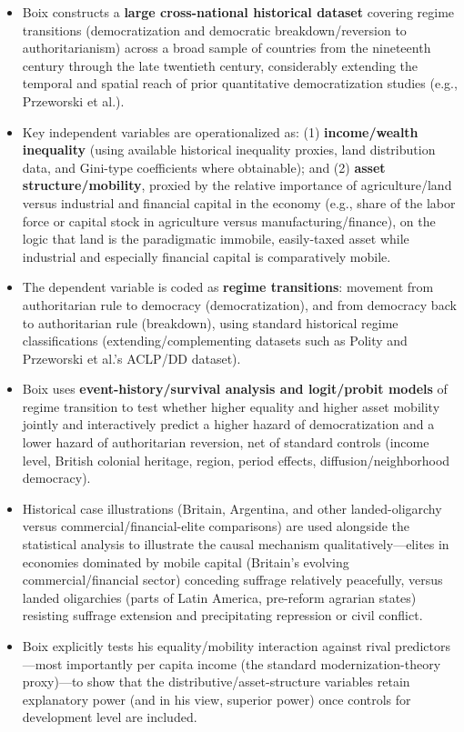 \documentclass[12pt]{article}
\begin{document}
\begin{itemize}[leftmargin=*, itemsep=4pt]
    \item Boix constructs a \textbf{large cross-national historical dataset} covering regime transitions (democratization and democratic breakdown/reversion to authoritarianism) across a broad sample of countries from the nineteenth century through the late twentieth century, considerably extending the temporal and spatial reach of prior quantitative democratization studies (e.g., Przeworski et al.).
    \item Key independent variables are operationalized as: (1) \textbf{income/wealth inequality} (using available historical inequality proxies, land distribution data, and Gini-type coefficients where obtainable); and (2) \textbf{asset structure/mobility}, proxied by the relative importance of agriculture/land versus industrial and financial capital in the economy (e.g., share of the labor force or capital stock in agriculture versus manufacturing/finance), on the logic that land is the paradigmatic immobile, easily-taxed asset while industrial and especially financial capital is comparatively mobile.
    \item The dependent variable is coded as \textbf{regime transitions}: movement from authoritarian rule to democracy (democratization), and from democracy back to authoritarian rule (breakdown), using standard historical regime classifications (extending/complementing datasets such as Polity and Przeworski et al.'s ACLP/DD dataset).
    \item Boix uses \textbf{event-history/survival analysis and logit/probit models} of regime transition to test whether higher equality and higher asset mobility jointly and interactively predict a higher hazard of democratization and a lower hazard of authoritarian reversion, net of standard controls (income level, British colonial heritage, region, period effects, diffusion/neighborhood democracy).
    \item Historical case illustrations (Britain, Argentina, and other landed-oligarchy versus commercial/financial-elite comparisons) are used alongside the statistical analysis to illustrate the causal mechanism qualitatively---elites in economies dominated by mobile capital (Britain's evolving commercial/financial sector) conceding suffrage relatively peacefully, versus landed oligarchies (parts of Latin America, pre-reform agrarian states) resisting suffrage extension and precipitating repression or civil conflict.
    \item Boix explicitly tests his equality/mobility interaction against rival predictors---most importantly per capita income (the standard modernization-theory proxy)---to show that the distributive/asset-structure variables retain explanatory power (and in his view, superior power) once controls for development level are included.
\end{itemize}
\end{document}
